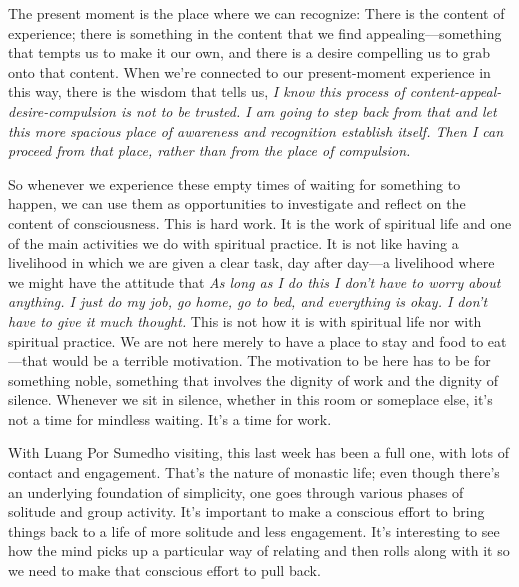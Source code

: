 The present moment is the place where we can recognize: There is the 
content of experience; there is something in the content that we find 
appealing---something that tempts us to make it our own, and there is a 
desire compelling us to grab onto that content. When we're connected to 
our present-moment experience in this way, there is the wisdom that 
tells us, \emph{I know this process of content-appeal-desire-compulsion 
is not to be trusted. I am going to step back from that and let this 
more spacious place of awareness and recognition establish itself. Then 
I can proceed from that place, rather than from the place of 
compulsion.}

So whenever we experience these empty times of waiting for something to 
happen, we can use them as opportunities to investigate and reflect on 
the content of consciousness. This is hard work. It is the work of 
spiritual life and one of the main activities we do with spiritual 
practice. It is not like having a livelihood in which we are given a 
clear task, day after day---a livelihood where we might have the 
attitude that \emph{As long as I do this I don't have to worry about 
anything. I just do my job, go home, go to bed, and everything is okay. 
I don't have to give it much thought.} This is not how it is with 
spiritual life nor with spiritual practice. We are not here merely to 
have a place to stay and food to eat---that would be a terrible 
motivation. The motivation to be here has to be for something noble, 
something that involves the dignity of work and the dignity of silence. 
Whenever we sit in silence, whether in this room or someplace else, 
it's not a time for mindless waiting. It's a time for work.


With Luang Por Sumedho visiting, this last week has been a full one, 
with lots of contact and engagement. That's the nature of monastic 
life; even though there's an underlying foundation of simplicity, one 
goes through various phases of solitude and group activity. It's 
important to make a conscious effort to bring things back to a life of 
more solitude and less engagement. It's interesting to see how the mind 
picks up a particular way of relating and then rolls along with it so 
we need to make that conscious effort to pull back.

